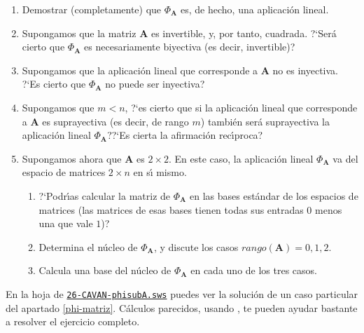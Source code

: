  \begin{enumerate}
 
  \item Demostrar (completamente) que $\Phi_{\mathbf{A}}$ es, de hecho,  una
aplicaci\'on lineal.
 
 \item Supongamos que la matriz $\mathbf{A}$ es invertible, y, por tanto,
cuadrada. ?`Ser\'a cierto que $\Phi_{\mathbf{A}}$ es necesariamente biyectiva
(es decir, invertible)? 
 
\item Supongamos que la aplicaci\'on lineal que corresponde a $\mathbf{A}$ {\sc
no} es inyectiva. ?`Es cierto que $\Phi_{\mathbf{A}}$ no puede ser inyectiva?

\item Supongamos que $m<n$, ?`es cierto que si la aplicaci\'on lineal que
corresponde a $\mathbf{A}$ es suprayectiva (es decir, de rango $m$) tambi\'en
ser\'a suprayectiva la aplicaci\'on lineal $\Phi_{\mathbf{A}}$??`Es cierta la
afirmaci\'on rec\'{\i}proca?
 
 \item Supongamos ahora que $\mathbf{A}$ es $2\times 2$. En este caso, la
aplicaci\'on lineal $\Phi_{\mathbf{A}}$ va del espacio
de matrices $2\times n$ en s\'{\i} mismo.
 
 \begin{enumerate}
 \item \label{phi-matriz}?`Podr\'{\i}as calcular la matriz de
$\Phi_{\mathbf{A}}$ en las bases
est\'andar de los espacios de matrices (las matrices de esas bases tienen todas
sus entradas $0$ menos una que vale $1$)?

\item Determina el n\'ucleo de $\Phi_{\mathbf{A}}$, y discute los casos
$rango(\mathbf{A})=0,1,2.$ 

 \item Calcula una base del n\'ucleo de $\Phi_{\mathbf{A}}$ en cada uno de los
tres casos.

\end{enumerate}
 \end{enumerate}


En la hoja de {\sage} 
\href{http://sage.mat.uam.es:8888/home/pub/25/}{\tt 26-CAVAN-phisubA.sws}
puedes ver la soluci\'on de un caso particular del apartado \ref{phi-matriz}.
C\'alculos parecidos,  usando {\sage},  te pueden ayudar bastante a resolver el
ejercicio completo.
